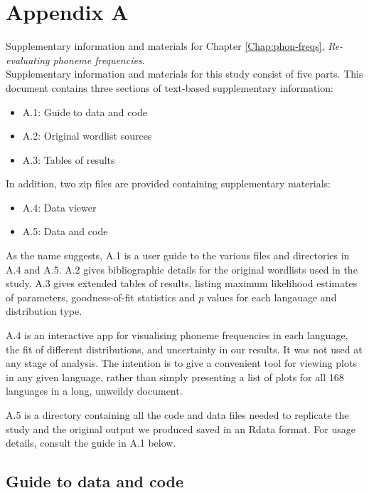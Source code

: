 \chapter{Appendix A}

Supplementary information and materials for Chapter \ref{Chap:phon-freqs}, \textit{Re-evaluating phoneme frequencies}.\\

\noindent
Supplementary information and materials for this study consist of five
parts. This document contains three sections of text-based supplementary
information:

\begin{itemize}
\tightlist
\item
  A.1: Guide to data and code
\item
  A.2: Original wordlist sources
\item
  A.3: Tables of results
\end{itemize}

In addition, two zip files are provided containing supplementary
materials:

\begin{itemize}
\tightlist
\item
  A.4: Data viewer
\item
  A.5: Data and code
\end{itemize}

As the name suggests, A.1 is a user guide to the various files and
directories in A.4 and A.5. A.2 gives bibliographic details for the
original wordlists used in the study. A.3 gives extended tables of
results, listing maximum likelihood estimates of parameters,
goodness-of-fit statistics and \(p\) values for each langauage and
distribution type.

A.4 is an interactive app for visualising phoneme frequencies in each
language, the fit of different distributions, and uncertainty in our
results. It was not used at any stage of analysis. The intention is to
give a convenient tool for viewing plots in any given language, rather
than simply presenting a list of plots for all 168 languages in a long,
unweildy document.

A.5 is a directory containing all the code and data files needed to
replicate the study and the original output we produced saved in an
Rdata format. For usage details, consult the guide in A.1 below.

\hypertarget{guide-to-data-and-code}{%
\section{Guide to data and code}\label{guide-to-data-and-code}}

